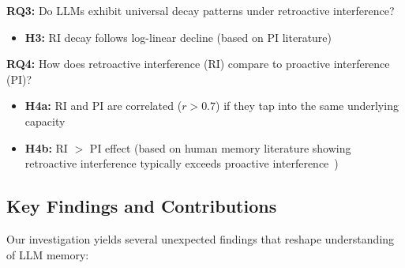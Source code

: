 \documentclass{article}
\begin{document}
\textbf{RQ3:} Do LLMs exhibit universal decay patterns under retroactive interference?
\begin{itemize}[itemsep=2pt,topsep=3pt,parsep=0pt]
    \item \textbf{H3:} RI decay follows log-linear decline (based on PI literature)
\end{itemize}
\vspace{-3pt}

\textbf{RQ4:} How does retroactive interference (RI) compare to proactive interference (PI)?
\begin{itemize}[itemsep=2pt,topsep=3pt,parsep=0pt]
    \item \textbf{H4a:} RI and PI are correlated ($r > 0.7$) if they tap into the same underlying capacity
    \item \textbf{H4b:} RI $>$ PI effect (based on human memory literature showing retroactive interference typically exceeds proactive interference~\citep{jenkins1924obliviscence, underwood1957interference})
\end{itemize}

\subsection{Key Findings and Contributions}

Our investigation yields several unexpected findings that reshape understanding of LLM memory:

\vspace{6pt}
\noindent{}
\vspace{6pt}
\end{document}
